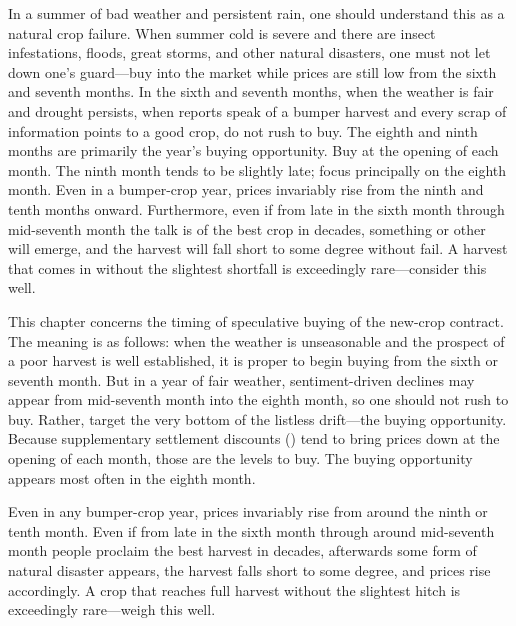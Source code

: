 \begin{sokyubox}
{\small\itshape\color{sokyubar} }

\medskip
In a summer of bad weather and persistent rain, one should understand
this as a natural crop failure. When summer cold is severe and there are
insect infestations, floods, great storms, and other natural disasters,
one must not let down one's guard---buy into the market while prices are
still low from the sixth and seventh months. In the sixth and seventh
months, when the weather is fair and drought persists, when reports
speak of a bumper harvest and every scrap of information points to a
good crop, do not rush to buy. The eighth and ninth months are primarily
the year's buying opportunity. Buy at the opening of each month. The
ninth month tends to be slightly late; focus principally on the eighth
month. Even in a bumper-crop year, prices invariably rise from the ninth
and tenth months onward. Furthermore, even if from late in the sixth
month through mid-seventh month the talk is of the best crop in decades,
something or other will emerge, and the harvest will fall short to some
degree without fail. A harvest that comes in without the slightest
shortfall is exceedingly rare---consider this well.
\end{sokyubox}

\commentary
This chapter concerns the timing of speculative buying of the new-crop
contract. The meaning is as follows: when the weather is unseasonable
and the prospect of a poor harvest is well established, it is proper to
begin buying from the sixth or seventh month. But in a year of fair
weather, sentiment-driven declines may appear from mid-seventh month
into the eighth month, so one should not rush to buy. Rather, target the
very bottom of the listless drift---the buying opportunity. Because
supplementary settlement discounts () tend to bring
prices down at the opening of each month, those are the levels to buy.
The buying opportunity appears most often in the eighth month.

Even in any bumper-crop year, prices invariably rise from around the
ninth or tenth month. Even if from late in the sixth month through
around mid-seventh month people proclaim the best harvest in decades,
afterwards some form of natural disaster appears, the harvest falls
short to some degree, and prices rise accordingly. A crop that reaches
full harvest without the slightest hitch is exceedingly rare---weigh
this well.

